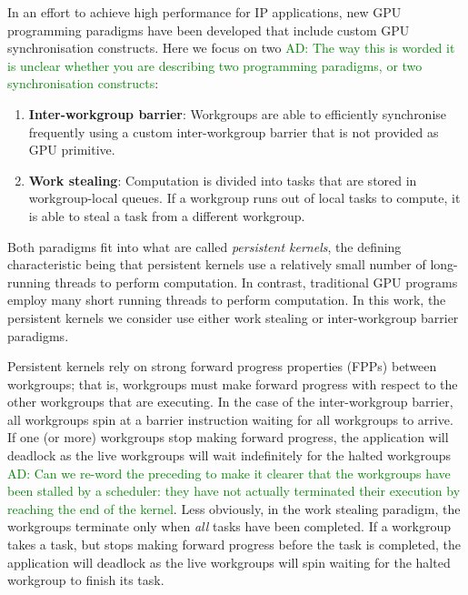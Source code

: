 \documentclass[nocopyrightspace]{sigplanconf-pldi16}
\newcommand{\ADComment}[1]{\textcolor{green}{AD: #1}}
\begin{document}
In an effort to achieve high performance for IP applications, new GPU
programming paradigms have been developed that include custom GPU
synchronisation constructs. Here we focus on two \ADComment{The way this is worded it is unclear whether you are describing two programming paradigms, or two synchronisation constructs}:

\begin{enumerate}
\item {\bf Inter-workgroup barrier}: Workgroups are able to
  efficiently synchronise frequently using a custom inter-workgroup
  barrier that is not provided as GPU primitive.

\item {\bf Work stealing}: Computation is divided into tasks that are
  stored in workgroup-local queues. If a workgroup runs out of local
  tasks to compute, it is able to steal a task from a different
  workgroup.
\end{enumerate}

Both paradigms fit into what are called \emph{persistent kernels}, the
defining characteristic being that persistent kernels use a relatively
small number of long-running threads to perform computation. In
contrast, traditional GPU programs employ many short running threads
to perform computation. In this work, the persistent kernels we consider
use either work stealing or inter-workgroup barrier paradigms.

Persistent kernels rely on strong forward progress properties (FPPs)
between workgroups; that is, workgroups must make forward progress with respect to
the other workgroups that are executing. In the case of the inter-workgroup barrier, all
workgroups spin at a barrier instruction waiting for all workgroups to
arrive. If one (or more) workgroups stop making forward progress, the
application will deadlock as the live workgroups will wait
indefinitely for the halted workgroups \ADComment{Can we re-word the preceding to make it clearer that the workgroups have been stalled by a scheduler: they have not actually terminated their execution by reaching the end of the kernel}. Less obviously, in the work
stealing paradigm, the workgroups terminate only when \emph{all} tasks
have been completed. If a workgroup takes a task, but stops making
forward progress before the task is completed, the application will
deadlock as the live workgroups will spin waiting for the halted
workgroup to finish its task.
\end{document}
